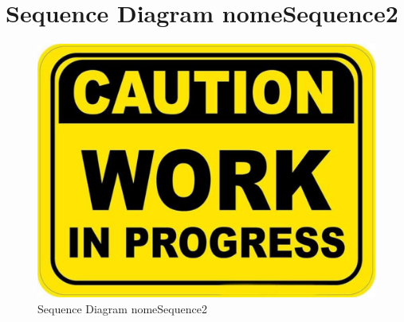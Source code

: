     \section{Sequence Diagram nomeSequence2}
        \begin{figure}[htbp!]
            \centering
                \vspace{2\baselineskip}
                \includegraphics[width=\linewidth]{Immagini/WorkInProgress.pdf}
            \caption{Sequence Diagram nomeSequence2}
            \label{fig:Sequence Diagram nomeSequence2}
        \end{figure}